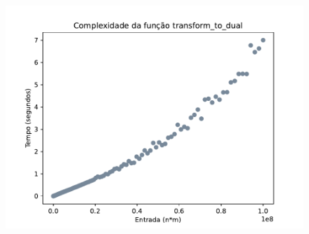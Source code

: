 \documentclass{article}
\begin{document}
\begin{figure}[H]
  \label{fig:experimento}
  \centering
  \includegraphics[scale=0.7]{complexidade.pdf}
\end{figure}
\end{document}
